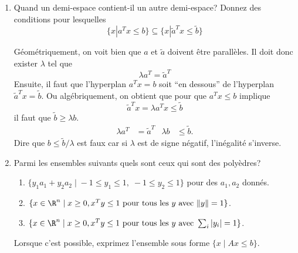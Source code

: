 \begin{enumerate}
  \item Quand un demi-espace contient-il un autre demi-espace? Donnez des
    conditions pour lesquelles
    \[\{x | a^Tx \leq b \} \subseteq \{x | \tilde a ^Tx \leq \tilde b \}\]


    \begin{solution}
      Géométriquement, on voit bien que $a$ et $\tilde{a}$ doivent être
      parallèles.
      Il doit donc exister $\lambda$ tel que
      \[ \lambda a^{T} = \tilde{a}^{T} \]
      Ensuite, il faut que l'hyperplan $a^Tx = b$ soit ``en dessous''
      de l'hyperplan $\tilde{a}^Tx = \tilde{b}$.
      Ou algébriquement, on obtient que pour que $a^Tx \leq b$ implique
      \[ \tilde{a}^Tx = \lambda a^Tx \leq \tilde{b} \]
      il faut que $\tilde{b} \geq \lambda b$.
      \begin{align*}
        \lambda a^T & = \tilde{a}^T & \lambda b & \leq \tilde{b}.
      \end{align*}
      Dire que $b \leq \tilde{b}/\lambda$ est faux car si $\lambda$ est
      de signe négatif, l'inégalité s'inverse.
    \end{solution}

  \item Parmi les ensembles suivants quels sont ceux qui sont des poly\`edres?

    \begin{enumerate}

      \item $\{y_1 a_1 + y_2 a_2 \; | \; -1 \leq y_1 \leq 1, \; -1 \leq y_2 \leq 1 \}$ pour des $a_1, a_2$
        donnés.

      \item $\{x \in \R^n \; | \; x \geq 0, x^T y \leq 1 \mbox{ pour tous les } y \mbox{ avec } \| y \| =1 \}$.

      \item $\{x \in \R^n \; | \; x \geq 0, x^T y \leq 1 \mbox{ pour tous les } y \mbox{ avec } \sum_i |y_i | =1 \}$.

    \end{enumerate}

    Lorsque c'est possible, exprimez l'ensemble sous forme $\{x \; | \; Ax \leq b\}$.




\end{enumerate}
